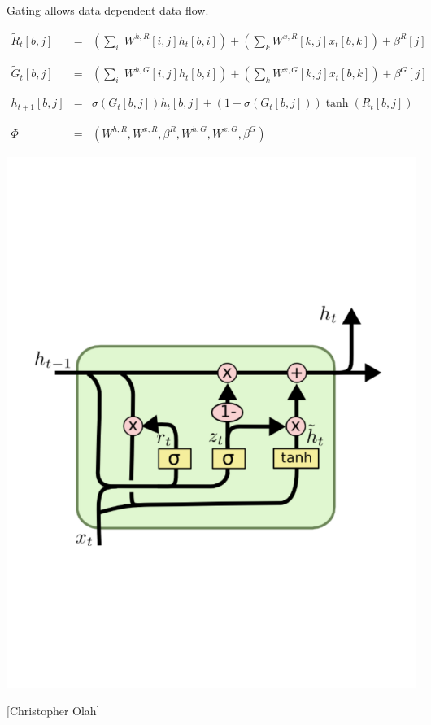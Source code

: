 {\vfill
Gating allows data dependent data flow.


{\huge
\begin{eqnarray*}
\tilde{R}_t[b,j] & = & \left(\sum_i\;W^{h,R}[i,j]h_t[b,i]\right) + \left(\sum_k W^{x,R}[k,j]x_t[b,k]\right) + \beta^R[j] \\
\\
\\
\tilde{G}_t[b,j] & = & \left(\sum_i\;W^{h,G}[i,j]h_t[b,i]\right) + \left(\sum_k W^{x,G}[k,j]x_t[b,k]\right) + \beta^G[j] \\
\\
\\
h_{t+1}[b,j] & = & \sigma(G_t[b,j]) h_t[b,j] + (1-\sigma(G_t[b,j])) \tanh(R_t[b,j]) \\
\\
\\
\Phi & = & (W^{h,R},W^{x,R},\beta^R,W^{h,G},W^{x,G},\beta^G)
\end{eqnarray*}
}


\centerline{\includegraphics[width=6.0in]{../images/GRU}}
\centerline{{\huge [Christopher Olah]}}

}
